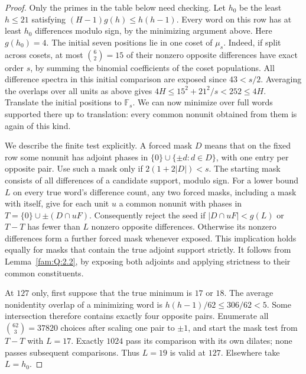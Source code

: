 \documentclass[11pt,a4paper]{article}
\numberwithin{equation}{section}
\theoremstyle{remark}
\begin{document}
\begin{proof}
Only the primes in the table below need checking. Let $h_0$ be
the least $h\le21$ satisfying $(H-1)g(h)\le h(h-1)$.
Every word on this row has at least $h_0$ differences modulo sign,
by the minimizing argument above. Here $g(h_0)=4$.
The initial seven positions lie in one coset of $\mu_s$.
Indeed, if split across cosets, at most $\binom62=15$ of their
nonzero opposite differences have exact order $s$, by summing the
binomial coefficients of the coset populations. All difference
spectra in this initial comparison are exposed since $43<s/2$.
Averaging the overlaps over all units as above gives
$4H\le15^2+21^2/s<252\le4H$. Translate the initial positions to
$\mathbb F_s$. We can now minimize over full words supported there
up to translation: every common nonunit obtained from them is
again of this kind.

We describe the finite test explicitly. A forced mask $D$ means that
on the fixed row some nonunit has adjoint phases in
$\{0\}\cup\{\pm d:d\in D\}$, with one entry per opposite pair.
Use such a mask only if $2(1+2|D|)<s$. The starting mask consists of
all differences of a candidate support, modulo sign.
For a lower bound $L$ on every true word's difference count,
any two forced masks, including a mask with itself, give for each
unit $u$ a common nonunit with phases in $T=\{0\}\cup\pm(D\cap uF)$.
Consequently reject the seed if $|D\cap uF|<g(L)$ or $T-T$
has fewer than $L$ nonzero opposite differences. Otherwise its
nonzero differences form a further forced mask whenever exposed.
This implication holds equally for masks that contain the true
adjoint support strictly. It follows from Lemma~\ref{fam:Q:2.2}, by exposing
both adjoints and applying strictness to their common constituents.

At $127$ only, first suppose that the true minimum is $17$ or $18$.
The average nonidentity overlap of a minimizing word is
$h(h-1)/62\le306/62<5$. Some intersection therefore contains exactly
four opposite pairs. Enumerate all $\binom{62}{3}=37820$ choices after
scaling one pair to $\pm1$, and start the mask test from $T-T$ with
$L=17$. Exactly $1024$ pass its comparison with its own dilates;
none passes subsequent comparisons. Thus $L=19$ is valid at $127$.
Elsewhere take $L=h_0$.


\end{proof}
\end{document}
